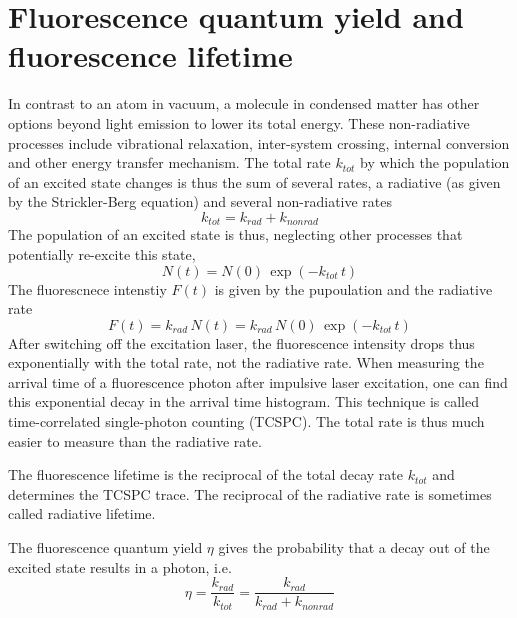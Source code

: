 \section{Fluorescence quantum yield and fluorescence lifetime} 



In contrast to an atom in vacuum, a molecule in condensed matter has other options beyond light emission to lower its total energy. These non-radiative processes include vibrational relaxation, inter-system crossing, internal conversion and other energy transfer mechanism. The total rate $k_{tot}$ by which the population of an excited state changes is thus the sum of several rates, a radiative  (as given by the Strickler-Berg equation) and several non-radiative rates 
\[
 k_{tot} = k_{rad} + k_{non rad} 
\]
%
The population of an excited state is thus, neglecting other processes that  potentially re-excite this state,
\[
 N(t) = N(0) \, \exp \left( - k_{tot}  \,t \right)
\]
The fluorescnece intenstiy $F(t)$ is given by the pupoulation and the radiative rate
\[
 F(t) = k_{rad} \, N(t) = k_{rad} \,  N(0) \, \exp \left( - k_{tot} \, t \right)
\]
After switching off the excitation laser, the fluorescence intensity drops thus exponentially with the total rate, not the radiative rate. When measuring the arrival time of a fluorescence photon after impulsive laser excitation, one can find this exponential decay in the arrival time histogram. This technique is called time-correlated single-photon counting (TCSPC). The total rate is thus much easier to measure than the radiative rate. 

The fluorescence lifetime is the reciprocal of the total decay rate $k_{tot}$ and determines the TCSPC trace. The reciprocal of the radiative rate is sometimes called radiative lifetime.

The fluorescence quantum yield $\eta$ gives the probability that a decay out of the excited state results in a photon, i.e.
\[
 \eta   = \frac{k_{rad}}{k_{tot}} = \frac{k_{rad}}{k_{rad} + k_{non rad}}
\]














\printbibliography[segment=\therefsegment,heading=subbibliography]
